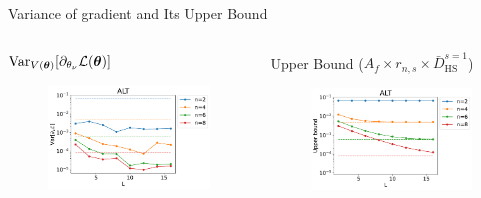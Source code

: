\documentclass[dvipdfmx,10pt,aspectratio=169]{beamer}
\begin{document}
\begin{frame}{Variance of gradient and Its Upper Bound}\label{qml-var-alt}
    \begin{columns}
        \begin{column}{0.5\textwidth}
            \centering $\operatorname{Var}_{V(\vb*{\theta})}[\partial_{\theta_\nu} \mathcal{L}(\vb*{\theta})]$
            \vspace{-10pt}
            \begin{figure}
                \centering\includegraphics[width=7cm]{qml-var-alt.pdf}
            \end{figure}
        \end{column}
        \begin{column}{0.5\textwidth}
            \centering Upper Bound ($A_f \times r_{n,s} \times \bar{D}_{\mathrm{HS}}^{s=1}$)
            \vspace{-10pt}
            \begin{figure}
                \centering\includegraphics[width=7cm]{qml-var-bound-alt.pdf}
            \end{figure}
        \end{column}
    \end{columns}
    

\end{frame}
\end{document}
